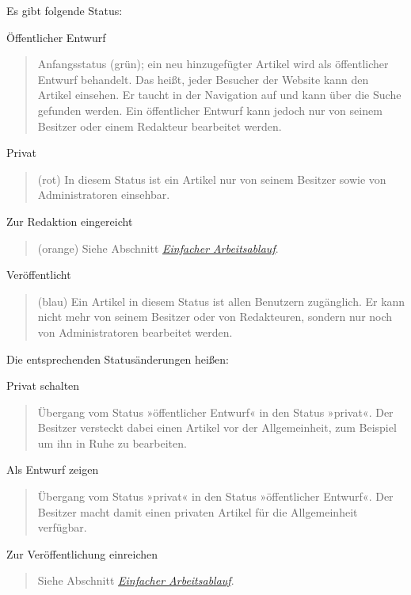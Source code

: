 \documentclass[a4paper,12pt,ngerman]{manual}
\begin{document}
Es gibt folgende Status:

Öffentlicher Entwurf
\begin{quote}

Anfangsstatus (grün); ein neu hinzugefügter
Artikel wird als öffentlicher Entwurf behandelt. Das heißt, jeder Besucher
der Website kann den Artikel einsehen. Er taucht in der Navigation auf und
kann über die Suche gefunden werden. Ein öffentlicher Entwurf kann jedoch
nur von seinem Besitzer oder einem Redakteur bearbeitet werden.
\end{quote}

Privat
\begin{quote}

(rot) In diesem Status ist ein Artikel nur von seinem Besitzer
sowie von Administratoren einsehbar.
\end{quote}

Zur Redaktion eingereicht
\begin{quote}

(orange) Siehe Abschnitt \hyperlink{sec-einf-publ}{\emph{Einfacher Arbeitsablauf}}.
\end{quote}

Veröffentlicht
\begin{quote}

(blau) Ein Artikel in diesem Status ist allen Benutzern
zugänglich. Er kann nicht mehr von seinem Besitzer oder von Redakteuren,
sondern nur noch von Administratoren bearbeitet werden.
\end{quote}

Die entsprechenden Statusänderungen heißen:

Privat schalten
\begin{quote}

Übergang vom Status »öffentlicher Entwurf« in den
Status »privat«. Der Besitzer versteckt dabei einen Artikel vor der
Allgemeinheit, zum Beispiel um ihn in Ruhe zu bearbeiten.
\end{quote}

Als Entwurf zeigen
\begin{quote}

Übergang vom Status »privat« in den Status
»öffentlicher Entwurf«. Der Besitzer macht damit einen privaten Artikel
für die Allgemeinheit verfügbar.
\end{quote}

Zur Veröffentlichung einreichen
\begin{quote}

Siehe Abschnitt \hyperlink{sec-einf-publ}{\emph{Einfacher Arbeitsablauf}}.
\end{quote}
\end{document}
